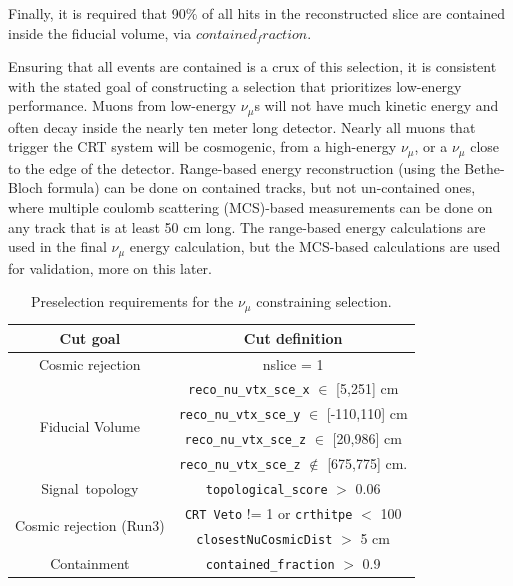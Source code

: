 \par Finally, it is required that 90$\%$ of all hits in the reconstructed slice are contained inside the fiducial volume, via $contained_fraction$.

\par Ensuring that all events are contained is a crux of this selection, it is consistent with the stated goal of constructing a selection that prioritizes low-energy performance. Muons from low-energy $\nu_{\mu}$s will not have much kinetic energy and often decay inside the nearly ten meter long detector. Nearly all muons that trigger the CRT system will be cosmogenic, from a high-energy $\nu_{\mu}$, or a $\nu_{\mu}$ close to the edge of the detector. Range-based energy reconstruction (using the Bethe-Bloch formula) can be done on contained tracks, but not un-contained ones, where multiple coulomb scattering (MCS)-based measurements can be done on any track that is at least 50 cm long. The range-based energy calculations are used in the final $\nu_{\mu}$ energy calculation, but the MCS-based calculations are used for validation, more on this later. 

\begin{table}[h!]
\centering
\setlength{\tabcolsep}{10pt}
\renewcommand{\arraystretch}{1.25}
 \begin{tabular}{| c | c |} 
 \hline
 Cut goal & Cut definition \\
 \hline\hline
 \multirow{1}{*}{ Cosmic rejection } & nslice = 1 \\
 \hline
 \multirow{4}{*}{Fiducial Volume} & \texttt{reco\_nu\_vtx\_sce\_x} $\in$ [5,251] cm \\ &
\texttt{reco\_nu\_vtx\_sce\_y} $\in$ [-110,110] cm \\ &
\texttt{reco\_nu\_vtx\_sce\_z} $\in$ [20,986] cm \\ &
\texttt{reco\_nu\_vtx\_sce\_z} $\not\in$ [675,775] cm.\\
\hline
\multirow{1}{*}{Signal~topology} & \texttt{topological\_score} $>$ 0.06 \\
 \hline
 \multirow{2}{*}{ Cosmic rejection (Run3) } & \texttt{CRT Veto} != 1 or \texttt{crthitpe} $<$ 100\\
& \texttt{closestNuCosmicDist} $>$ 5 cm\\
 \hline
Containment & \texttt{contained\_fraction} $>$ 0.9 \\
 \hline
 \end{tabular}
 \caption{\label{tab:numuCC:presel} Preselection requirements for the $\nu_\mu$ constraining selection.}
\end{table}


